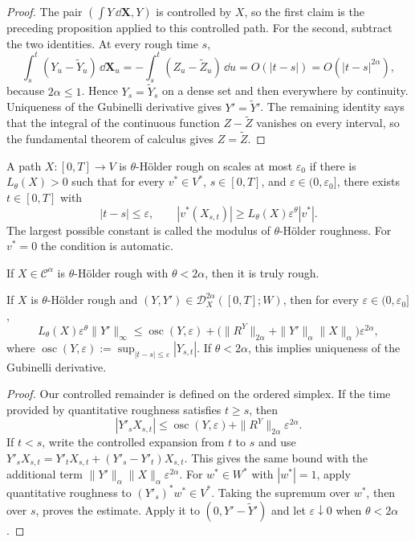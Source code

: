 \begin{proof}
The pair $(\int Y\,\dd\mathbf X,Y)$ is controlled by $X$, so the first claim
is the preceding proposition applied to this controlled path.  For the second,
subtract the two identities.  At every rough time $s$,
\[
  \int_s^t(Y_u-\widetilde Y_u)\,\dd\mathbf X_u
  =-\int_s^t(Z_u-\widetilde Z_u)\,\dd u
  =O(|t-s|)=O(|t-s|^{2\alpha}),
\]
because $2\alpha\le1$.  Hence $Y_s=\widetilde Y_s$ on a dense set and then
everywhere by continuity.  Uniqueness of the Gubinelli derivative gives
$Y'=\widetilde Y'$.  The remaining identity says that the integral of the
continuous function $Z-\widetilde Z$ vanishes on every interval, so the
fundamental theorem of calculus gives $Z=\widetilde Z$.
\end{proof}

\begin{de}
A path $X\colon[0,T]\to V$ is $\theta$-Hölder rough on scales at most
$\varepsilon_0$ if there is $L_\theta(X)>0$ such that for every
$v^*\in V^*$, $s\in[0,T]$, and $\varepsilon\in(0,\varepsilon_0]$, there exists
$t\in[0,T]$ with
\[
  |t-s|\le\varepsilon,
  \qquad
  |v^*(X_{s,t})|\ge L_\theta(X)\varepsilon^\theta|v^*|.
\]
The largest possible constant is called the modulus of $\theta$-Hölder
roughness.  For $v^*=0$ the condition is automatic.
\end{de}

If $X\in\mathcal C^\alpha$ is $\theta$-Hölder rough with $\theta<2\alpha$,
then it is truly rough.

\begin{prop}
If $X$ is $\theta$-Hölder rough and
$(Y,Y')\in\mathscr D_X^{2\alpha}([0,T];W)$, then for every
$\varepsilon\in(0,\varepsilon_0]$,
\[
  L_\theta(X)\varepsilon^\theta\|Y'\|_\infty
  \le \operatorname{osc}(Y,\varepsilon)
      +\bigl(\|R^Y\|_{2\alpha}
             +\|Y'\|_\alpha\|X\|_\alpha\bigr)
       \varepsilon^{2\alpha},
\]
where
$\operatorname{osc}(Y,\varepsilon)
 :=\sup_{|t-s|\le\varepsilon}|Y_{s,t}|$.
If $\theta<2\alpha$, this implies uniqueness of the Gubinelli derivative.
\end{prop}

\begin{proof}
Our controlled remainder is defined on the ordered simplex.  If the time
provided by quantitative roughness satisfies $t\ge s$, then
\[
 |Y'_sX_{s,t}|
 \le \operatorname{osc}(Y,\varepsilon)
     +\|R^Y\|_{2\alpha}\varepsilon^{2\alpha}.
\]
If $t<s$, write the controlled expansion from $t$ to $s$ and use
$Y'_sX_{s,t}=Y'_tX_{s,t}+(Y'_s-Y'_t)X_{s,t}$.  This gives the same bound with
the additional term
$\|Y'\|_\alpha\|X\|_\alpha\varepsilon^{2\alpha}$.  For
$w^*\in W^*$ with $|w^*|=1$, apply quantitative roughness to
$(Y'_s)^*w^*\in V^*$.  Taking the supremum over $w^*$, then over $s$, proves
the estimate.  Apply it to $(0,Y'-\widetilde Y')$ and let
$\varepsilon\downarrow0$ when $\theta<2\alpha$.
\end{proof}

